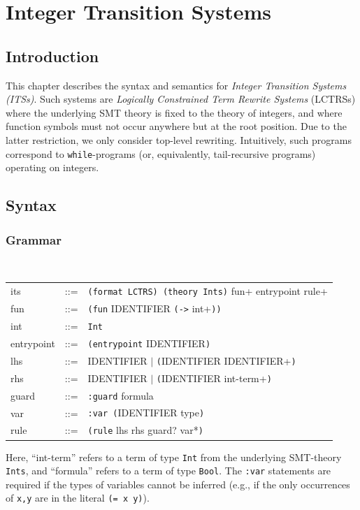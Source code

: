 \chapter{Integer Transition Systems}
\label{chap:its}

\section{Introduction}
This chapter describes the syntax and semantics for \emph{Integer Transition Systems (ITSs)}.
% 
Such systems are \emph{Logically Constrained Term Rewrite Systems} (LCTRSs) where the underlying SMT theory is fixed to the theory of integers, and where function symbols must not occur anywhere but at the root position.
% 
Due to the latter restriction, we only consider top-level rewriting.
% 
Intuitively, such programs correspond to \texttt{while}-programs (or, equivalently, tail-recursive programs) operating on integers.

\section{Syntax}

\subsection{Grammar}
\

\begin{tabular}{lll}
its & ::= & \texttt{(format LCTRS) (theory Ints)} fun+ entrypoint rule+ \\
fun & ::= & \texttt{(fun} IDENTIFIER \texttt{(->} int+\texttt{))} \\
int & ::= & \texttt{Int} \\
entrypoint & ::= & \texttt{(entrypoint} IDENTIFIER\texttt{)} \\
lhs & ::= & IDENTIFIER $|$ \texttt{(}IDENTIFIER IDENTIFIER+\texttt{)} \\
rhs & ::= & IDENTIFIER $|$ \texttt{(}IDENTIFIER int-term+\texttt{)} \\
guard & ::= & \texttt{:guard} formula \\
var & ::= & \texttt{:var (}IDENTIFIER type\texttt{)} \\
rule & ::= & \texttt{(rule} lhs rhs guard? var*\texttt{)} \\
\end{tabular}

\bigskip
Here, ``int-term'' refers to a term of type \texttt{Int} from the underlying SMT-theory \texttt{Ints}, and ``formula'' refers to a term of type \texttt{Bool}.
%
The \texttt{:var} statements are required if the types of variables cannot be inferred (e.g., if the only occurrences of \texttt{x,y} are in the literal \texttt{(= x y)}).

